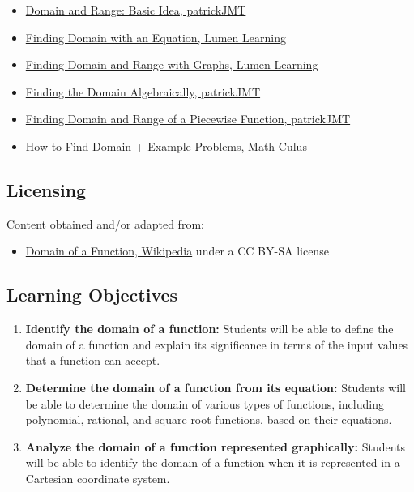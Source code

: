 \begin{itemize}
    \item \href{https://www.youtube.com/watch?v=Q3NWljhiSJg}{Domain and Range: Basic Idea, patrickJMT}
    \item \href{https://courses.lumenlearning.com/ivytech-collegealgebra/chapter/find-the-domain-of-a-function-defined-by-an-equation/}{Finding Domain with an Equation, Lumen Learning}
    \item \href{https://courses.lumenlearning.com/ivytech-collegealgebra/chapter/find-domain-and-range-from-graphs/}{Finding Domain and Range with Graphs, Lumen Learning}
    \item \href{https://www.youtube.com/watch?v=w81y25anEOM}{Finding the Domain Algebraically, patrickJMT}
    \item \href{https://www.youtube.com/watch?v=BxaYyS6lsQ4}{Finding Domain and Range of a Piecewise Function, patrickJMT}
    \item \href{https://mathculus.com/how-to-find-the-domain-of-a-function-algebraically/}{How to Find Domain + Example Problems, Math Culus}
\end{itemize}

\subsection{Licensing}
\label{sss:lice-7352}

Content obtained and/or adapted from:

\begin{itemize}
    \item \href{https://en.wikipedia.org/wiki/Domain_of_a_function}{Domain of a Function, Wikipedia} under a CC BY-SA license
\end{itemize}

\subsection{Learning Objectives}
\label{ssec:lear-ccc8}

\begin{enumerate}
    \item \textbf{Identify the domain of a function:} Students will be able to define the domain of a function and explain its significance in terms of the input values that a function can accept.
    \item \textbf{Determine the domain of a function from its equation:} Students will be able to determine the domain of various types of functions, including polynomial, rational, and square root functions, based on their equations.
    \item \textbf{Analyze the domain of a function represented graphically:} Students will be able to identify the domain of a function when it is represented in a Cartesian coordinate system.
\end{enumerate}

